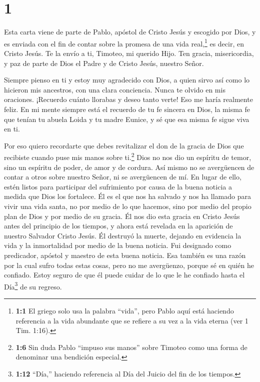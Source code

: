 \hypertarget{section}{%
\section{1}\label{section}}

 Esta carta viene de parte de Pablo, apóstol de Cristo Jesús
y escogido por Dios, y es enviada con el fin de contar sobre la promesa
de una vida real,\footnote{\textbf{1:1} El griego solo usa la palabra
  ``vida'', pero Pablo aquí está haciendo referencia a la vida abundante
  que se refiere a su vez a la vida eterna (ver 1 Tim. 1:16).} es decir,
en Cristo Jesús.  Te la envío a ti, Timoteo, mi querido
Hijo. Ten gracia, misericordia, y paz de parte de Dios el Padre y de
Cristo Jesús, nuestro Señor.

 Siempre pienso en ti y estoy muy agradecido con Dios, a
quien sirvo así como lo hicieron mis ancestros, con una clara
conciencia. Nunca te olvido en mis oraciones.  ¡Recuerdo
cuánto llorabas y deseo tanto verte! Eso me haría realmente feliz.
 En mi mente siempre está el recuerdo de tu fe sincera en
Dios, la misma fe que tenían tu abuela Loida y tu madre Eunice, y sé que
esa misma fe sigue viva en ti.

 Por eso quiero recordarte que debes revitalizar el don de
la gracia de Dios que recibiste cuando puse mis manos sobre
ti.\footnote{\textbf{1:6} Sin duda Pablo ``impuso sus manos'' sobre
  Timoteo como una forma de denominar una bendición especial.}
 Dios no nos dio un espíritu de temor, sino un espíritu de
poder, de amor y de cordura.  Así mismo no se avergüencen de
contar a otros sobre nuestro Señor, ni se avergüencen de mí. En lugar de
ello, estén listos para participar del sufrimiento por causa de la buena
noticia a medida que Dios los fortalece.  Él es el que nos
ha salvado y nos ha llamado para vivir una vida santa, no por medio de
lo que hacemos, sino por medio del propio plan de Dios y por medio de su
gracia.  Él nos dio esta gracia en Cristo Jesús antes del
principio de los tiempos, y ahora está revelada en la aparición de
nuestro Salvador Cristo Jesús. Él destruyó la muerte, dejando en
evidencia la vida y la inmortalidad por medio de la buena noticia.
 Fui designado como predicador, apóstol y maestro de esta
buena noticia.  Esa también es una razón por la cual sufro
todas estas cosas, pero no me avergüenzo, porque sé en quién he
confiado. Estoy seguro de que él puede cuidar de lo que le he confiado
hasta el Día\footnote{\textbf{1:12} ``Día,'' haciendo referencia al Día
  del Juicio del fin de los tiempos.} de su regreso.


